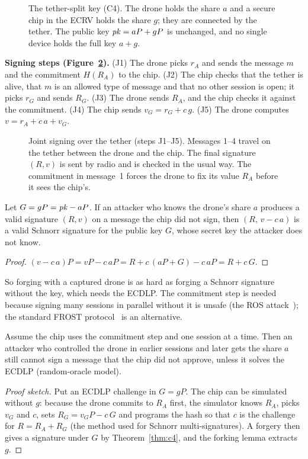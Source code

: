 \documentclass[11pt,openany]{report}
\begin{document}
\begin{figure}[H]
\centering

\caption{The tether-split key (C4). The drone holds the share $a$ and a secure chip in the ECRV holds the share $g$; they are connected by the tether.
The public key $\mathit{pk}=aP+gP$ is unchanged, and no single device holds the full key $a+g$.}
\label{fig:split}
\end{figure}

\textbf{Signing steps (Figure~\ref{fig:c4flow}).} (J1) The drone picks $r_A$ and sends the message $m$ and the commitment $H(R_A)$ to the chip.
(J2) The chip checks that the tether is alive, that $m$ is an allowed type of message and that no other session is open; it picks $r_G$ and sends
$R_G$. (J3) The drone sends $R_A$, and the chip checks it against the commitment. (J4) The chip sends $v_G=r_G+c\,g$. (J5) The drone computes
$v=r_A+c\,a+v_G$.

\begin{figure}[H]
\centering

\caption{Joint signing over the tether (steps J1--J5). Messages 1--4 travel on the tether between the drone and the chip. The final signature $(R,v)$
is sent by radio and is checked in the usual way. The commitment in message~1 forces the drone to fix its value $R_A$ before it sees the chip's.}
\label{fig:c4flow}
\end{figure}

\begin{theorem}\label{thm:c4}
Let $G=gP=\mathit{pk}-aP$. If an attacker who knows the drone's share $a$ produces a valid signature $(R,v)$ on a message the chip did not sign, then
$(R,\,v-c\,a)$ is a valid Schnorr signature for the public key $G$, whose secret key the attacker does not know.
\end{theorem}
\begin{proof}
$(v-c\,a)P=vP-c\,aP=R+c\,(aP+G)-c\,aP=R+c\,G$.
\end{proof}
So forging with a captured drone is as hard as forging a Schnorr signature without the key, which needs the ECDLP. The commitment step is needed
because signing many sessions in parallel without it is unsafe (the ROS attack~\cite{ros21}); the standard FROST protocol~\cite{rfc9591} is an
alternative.

\begin{theorem}\label{thm:c4b}
Assume the chip uses the commitment step and one session at a time. Then an attacker who controlled the drone in earlier sessions and later gets the
share $a$ still cannot sign a message that the chip did not approve, unless it solves the ECDLP (random-oracle model).
\end{theorem}
\begin{proof}[Proof sketch]
Put an ECDLP challenge in $G=gP$. The chip can be simulated without $g$: because the drone commits to $R_A$ first, the simulator knows $R_A$, picks
$v_G$ and $c$, sets $R_G=v_GP-c\,G$ and programs the hash so that $c$ is the challenge for $R=R_A+R_G$ (the method used for Schnorr
multi-signatures). A forgery then gives a signature under $G$ by Theorem~\ref{thm:c4}, and the forking lemma extracts $g$.
\end{proof}
\end{document}
